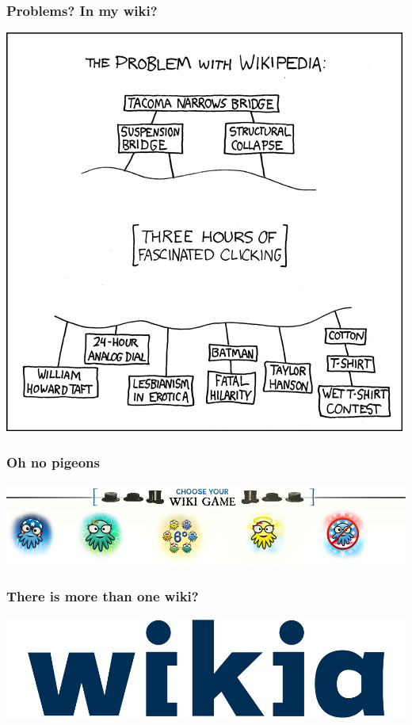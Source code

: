\documentclass{beamer}
\begin{document}
\begin{frame}
  \frametitle{Problems? In my wiki?}
  \begin{center}
    \includegraphics[height = 0.8\textheight, keepaspectratio = true]{figure/the_problem_with_wikipedia}
  \end{center}
\end{frame}

\begin{frame}
  \frametitle{Oh no pigeons}
  \begin{center}
    \includegraphics[width = \textwidth, keepaspectratio = true]{figure/wiki_game}
  \end{center}
\end{frame}

\begin{frame}
  \frametitle{There is more than one wiki?}
  \begin{center}
    \includegraphics[width = \textwidth, keepaspectratio = true]{figure/wikia}
  \end{center}
\end{frame}
\end{document}
